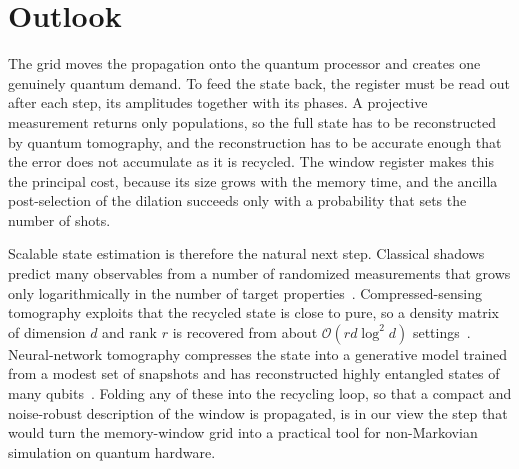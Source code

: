 \documentclass[aps,pra,twocolumn,superscriptaddress,nofootinbib,longbibliography]{revtex4-2}
\begin{document}
\section{Outlook}
\label{sec:outlook}
The grid moves the propagation onto the quantum processor and creates one
genuinely quantum demand. To feed the state back, the register must be read out
after each step, its amplitudes together with its phases. A projective
measurement returns only populations, so the full state has to be reconstructed
by quantum tomography, and the reconstruction has to be accurate enough that the
error does not accumulate as it is recycled. The window register makes this the
principal cost, because its size grows with the memory time, and the ancilla
post-selection of the dilation succeeds only with a probability that sets the
number of shots.

Scalable state estimation is therefore the natural next step. Classical shadows
predict many observables from a number of randomized measurements that grows only
logarithmically in the number of target properties~\cite{huang2020}.
Compressed-sensing tomography exploits that the recycled state is close to pure,
so a density matrix of dimension $d$ and rank $r$ is recovered from about
$\mathcal{O}(rd\log^2 d)$ settings~\cite{gross2010}. Neural-network tomography
compresses the state into a generative model trained from a modest set of
snapshots and has reconstructed highly entangled states of many
qubits~\cite{torlai2018}. Folding any of these into the recycling loop, so that a
compact and noise-robust description of the window is propagated, is in our view
the step that would turn the memory-window grid into a practical tool for
non-Markovian simulation on quantum hardware.

\end{document}
